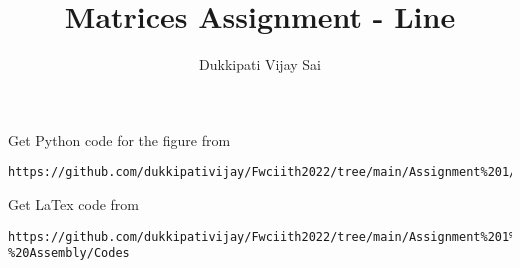 \documentclass[journal,12pt,twocolumn]{IEEEtran}
\begin{document}
\makeatother
\let\StandardTheFigure\thefigure
\let\vec\mathbf
\renewcommand{\thefigure}{\theproblem}
\def\putbox#1#2#3{\makebox[0in][l]{\makebox[#1][l]{}\raisebox{\baselineskip}[0in][0in]{\raisebox{#2}[0in][0in]{#3}}}}
     \def\rightbox#1{\makebox[0in][r]{#1}}
     \def\centbox#1{\makebox[0in]{#1}}
     \def\topbox#1{\raisebox{-\baselineskip}[0in][0in]{#1}}
     \def\midbox#1{\raisebox{-0.5\baselineskip}[0in][0in]{#1}}
\vspace{3cm}
\title{\textbf{Matrices Assignment - Line} }
\author{Dukkipati Vijay Sai}
\maketitle
\newpage
\bigskip
\renewcommand{\thefigure}{\theenumi}
\renewcommand{\thetable}{\theenumi}
Get Python code for the figure from 
\begin{lstlisting}
https://github.com/dukkipativijay/Fwciith2022/tree/main/Assignment%201/Codes/src
\end{lstlisting}
Get LaTex code from
\begin{lstlisting}
https://github.com/dukkipativijay/Fwciith2022/tree/main/Assignment%201%20-%20Assembly/Codes
\end{lstlisting}
%
\end{document}
